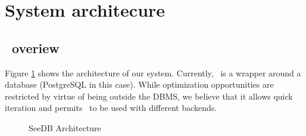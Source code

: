 \section{System architecure}
\label{sec:system_architecture}

\subsection{\SeeDB\ overiew}
\label{subsec:overview}

Figure \ref{fig:sys-arch} shows the architecture of our system. Currently, 
\SeeDB\ is a wrapper around a database (PostgreSQL in this case). While
optimization opportunities are restricted by virtue of being outside the DBMS,
we believe that it allows quick iteration and permits \SeeDB\ to be used with
different backends. 

\begin{figure}[htb]
\centerline{
\hbox{}}
\caption{SeeDB Architecture}
\label{fig:sys-arch}
\end{figure} 


